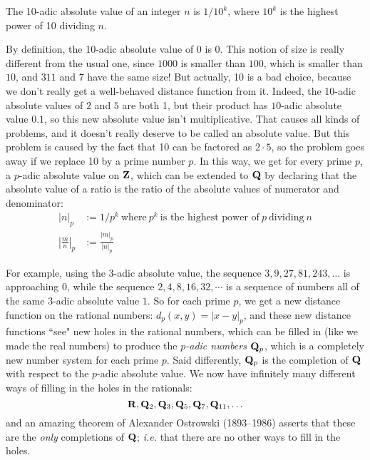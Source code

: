 \documentclass[11pt,oneside]{amsart}
\begin{document}
\begin{definition}
	The 10-adic absolute value of an integer $n$ is $1/10^k$, where $10^k$ is the highest power of
	10 dividing $n$.
\end{definition}  

By definition, the 10-adic absolute value of $0$ is 0.  This notion of size 
is really different from the usual one, since $1000$ is smaller than $100$, which is smaller than $10$,
and $311$ and $7$ have the same size!  But actually, 10 is a bad choice, because we don't really get a well-behaved
distance function from it.  Indeed, the 10-adic absolute values of $2$ and $5$ are both 1, but their product has 
$10$-adic absolute value $0.1$, so this new absolute value isn't multiplicative.  That causes all kinds of problems,
and it doesn't really deserve to be called an absolute value.  But this problem is caused by the fact that 10 can be factored as $2\cdot 5$,
so the problem goes away if we replace 10 by a prime number $p$.  In this way, we get for every prime $p$,
a $p$-adic absolute value on $\mathbf{Z}$, which can be extended to $\mathbf{Q}$ by declaring that the absolute value of
a ratio is the ratio of the absolute values of numerator and denominator:
\begin{align*}
	|n|_p &:= 1/p^k\ \text{where}\ p^k\ \text{is the highest power of}\ p\ \text{dividing}\ n \\
	\left|\frac{m}{n}\right|_p &:= \frac{|m|_p}{ |n|_p}
\end{align*}

For example, using the $3$-adic absolute value, the sequence $3,9,27,81,243,\ldots$ is approaching 0,
while the sequence $2,4,8,16,32,\cdots$ is a sequence of numbers all of the same $3$-adic absolute value $1$.
So for each prime $p$, we get a new distance function on the rational numbers: $d_p(x,y)=|x-y|_p$,
and these new distance functions ``see" new holes in the rational numbers, which can be filled in (like we made the real numbers)
to produce the {\em $p$-adic numbers $\mathbf{Q}_p$}, which is a completely new number system for each prime $p$.
Said differently, $\mathbf{Q}_p$ is the completion of $\mathbf{Q}$ with respect to the $p$-adic absolute value.
We now have infinitely many different ways of filling in the holes in the rationals:
$$
  \mathbf{R}, \mathbf{Q}_2, \mathbf{Q}_3, \mathbf{Q}_5, \mathbf{Q}_7, \mathbf{Q}_{11}, \ldots
$$
and an amazing theorem of Alexander Ostrowski (1893--1986) asserts that these are the {\em only} completions of $\mathbf{Q}$;
{\em i.e.} that there are no other ways to fill in the holes.
\end{document}
